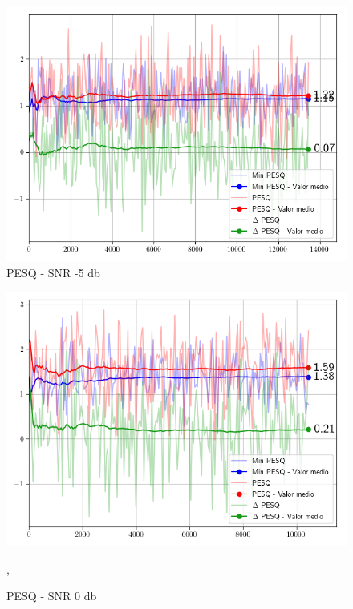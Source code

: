 \begin{figure}
	\centering
	\centerline{\includegraphics[scale=0.70]{images/ch7/objective_metrics/metric_PESQ_-5db.png}}
	\caption{PESQ - SNR -5 db}
	\label{fig:ch7_pesq_minus_five_db}
\end{figure}

\begin{figure}
	\centering
	\centerline{\includegraphics[scale=0.70]{images/ch7/objective_metrics/metric_PESQ_0db.png}}
	\caption{PESQ - SNR 0 db}
	\label{fig:ch7_pesq_cero_db},
\end{figure}

